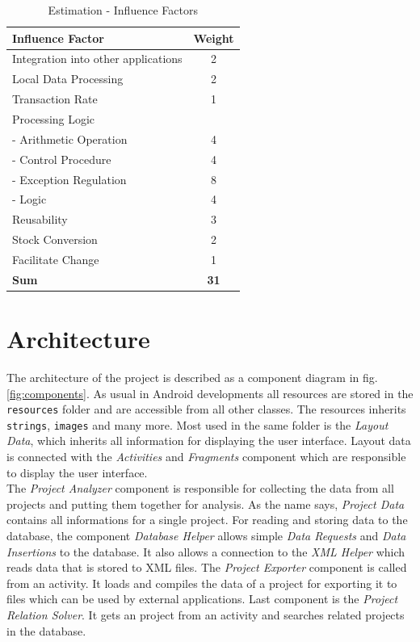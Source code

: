 \begin{table}[h]
	\centering 
	\setlength{\tabcolsep}{4pt}
	\begin{tabular}{|l|c|}\hline
		Influence Factor						&  Weight 	\\ \hline
		Integration into other applications   	& 2      		\\ \hline
		Local Data Processing   				& 2      		\\ \hline
		Transaction Rate   						& 1      		\\ \hline
		Processing Logic   						&       		\\ \hline
		\phantom{ab}- Arithmetic Operation   					& 4      		\\ \hline
		\phantom{ab}- Control Procedure   					& 4      		\\ \hline
		\phantom{ab}- Exception Regulation   					& 8      		\\ \hline
		\phantom{ab}- Logic   								& 4      		\\ \hline
		Reusability   							& 3      		\\ \hline
		Stock Conversion  						& 2      		\\ \hline
		Facilitate Change   					& 1      		\\ \hline
		\textbf{Sum}   									& \textbf{31}      		\\ \hline
	\end{tabular} 
	\caption{Estimation - Influence Factors} 
	\label{estimation:influence} 
\end{table}

\section{Architecture}

The architecture of the project is described as a component diagram in fig. \ref{fig:components}. As usual in Android developments all resources are stored in the \texttt{resources} folder and are accessible from all other classes. The resources inherits \texttt{strings}, \texttt{images} and many more. Most used in the same folder is the \textit{Layout Data}, which inherits all information for displaying the user interface. Layout data is connected with the \textit{Activities} and \textit{Fragments} component which are responsible to display the user interface.\\
The \textit{Project Analyzer} component is responsible for collecting the data from all projects and putting them together for analysis. As the name says, \textit{Project Data} contains all informations for a single project. For reading and storing data to the database, the component \textit{Database Helper} allows simple \textit{Data Requests} and \textit{Data Insertions} to the database. It also allows a connection to the \textit{XML Helper} which reads data that is stored to XML files. The \textit{Project Exporter} component is called from an activity. It loads and compiles the data of a project for exporting it to files which can be used by external applications. Last component is the \textit{Project Relation Solver}. It gets an project from an activity and searches related projects in the database.

